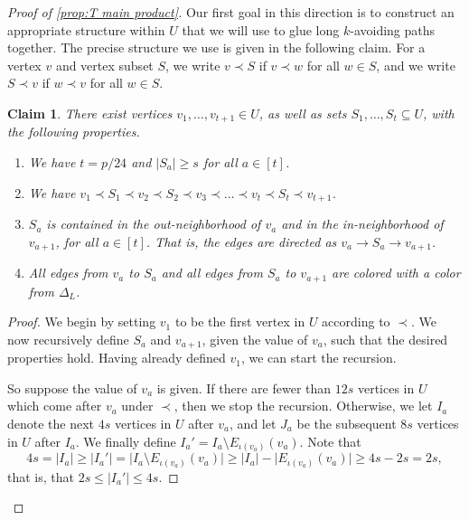 \documentclass[11pt,reqno]{amsart}
\newtheorem{claim}[theorem]{Claim}
\theoremstyle{definition}
\newcommand\ab[1]{\lvert#1\rvert}
\newcommand\1{\mathbf{1}}
\let\leq\leqslant
\let\geq\geqslant
\begin{document}
\begin{proof}[Proof of \cref{prop:T main product}]
    Our first goal in this direction is to construct an appropriate structure within $U$ that we will use to glue long $k$-avoiding paths together. The precise structure we use is given in the following claim. For a vertex $v$ and vertex subset $S$, we write $v \prec S$ if $v \prec w$ for all $w \in S$, and we write $S \prec v$ if $w \prec v$ for all $w \in S$. 
    \begin{claim}\label{claim:gluing structure}
        There exist vertices $v_1,\dots,v_{t+1} \in U$, as well as sets $S_1,\dots,S_{t}\subseteq U$, with the following properties.
        \begin{enumerate}[label=(\roman*)]
            \item We have $t=p/24$ and $\ab{S_a}\geq s$ for all $a \in [t]$.\label{it:sizes}
            \item We have $v_1 \prec S_1 \prec v_2 \prec S_2 \prec v_3 \prec \dots \prec v_{t} \prec S_{t}\prec v_{t+1}$.\label{it:order}
            \item $S_a$ is contained in the out-neighborhood of $v_a$ and in the in-neighborhood of $v_{a+1}$, for all $a \in [t]$. That is, the edges are directed as $v_a \to S_a \to v_{a+1}$. \label{it:direction}
            \item All edges from $v_a$ to $S_a$ and all edges from $S_a$ to $v_{a+1}$ are colored with a color from $\Delta_L$.\label{it:color}
        \end{enumerate}
    \end{claim}
    \begin{proof}
        We begin by setting $v_1$ to be the first vertex in $U$ according to $\prec$. We now recursively define $S_a$ and $v_{a+1}$, given the value of $v_a$, such that the desired properties hold. Having already defined $v_1$, we can start the recursion.

        So suppose the value of $v_a$ is given. If there are fewer than $12s$ vertices in $U$ which come after $v_a$ under $\prec$, then we stop the recursion. Otherwise, we let $I_a$ denote the next $4s$ vertices in $U$ after $v_a$, and let $J_a$ be the subsequent $8s$ vertices in $U$ after $I_a$. We finally define $I_a' = I_a \setminus E_{\iota(v_a)}(v_a)$. 
        Note that 
        \[
            4s = \ab{I_a} \geq \ab{I_a'} = \ab{I_a \setminus E_{\iota(v_a)}(v_a)} \geq \ab{I_a} - \ab{E_{\iota(v_a)}(v_a)} \geq 4s - 2s = 2s,
        \]
        that is, that $2s \leq \ab{I_a'} \leq 4s$.


\end{proof}
\end{proof}
\end{document}
